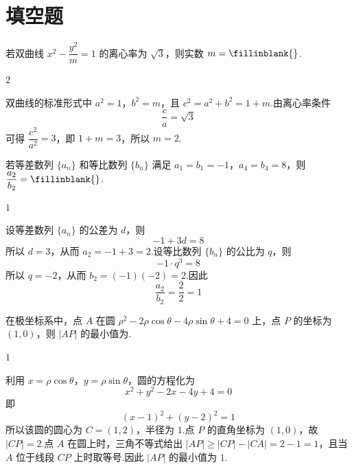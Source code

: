 \section{填空题}

\begin{problem}
若双曲线 \(x^2-\dfrac{y^2}{m}=1\) 的离心率为 \(\sqrt3\)，则实数 \(m=\fillinblank{}\).
\end{problem}

\begin{answer}
\(2\)
\end{answer}

\begin{solution}
双曲线的标准形式中 \(a^2=1\)，\(b^2=m\)，且 \(c^2=a^2+b^2=1+m\).由离心率条件
\[
\frac{c}{a}=\sqrt3
\]
可得 \(\dfrac{c^2}{a^2}=3\)，即 \(1+m=3\)，所以 \(m=2\).
\end{solution}

\begin{problem}
若等差数列 \(\{a_n\}\) 和等比数列 \(\{b_n\}\) 满足 \(a_1=b_1=-1\)，\(a_4=b_4=8\)，则 \(\dfrac{a_2}{b_2}=\fillinblank{}\).
\end{problem}

\begin{answer}
\(1\)
\end{answer}

\begin{solution}
设等差数列 \(\{a_n\}\) 的公差为 \(d\)，则
\[
-1+3d=8
\]
所以 \(d=3\)，从而 \(a_2=-1+3=2\).设等比数列 \(\{b_n\}\) 的公比为 \(q\)，则
\[
-1\cdot q^3=8
\]
所以 \(q=-2\)，从而 \(b_2=(-1)(-2)=2\).因此
\[
\frac{a_2}{b_2}=\frac22=1
\]
\end{solution}

\begin{problem}
在极坐标系中，点 \(A\) 在圆 \(\rho^2-2\rho\cos\theta-4\rho\sin\theta+4=0\) 上，点 \(P\) 的坐标为 \((1,0)\)，则 \(|AP|\) 的最小值为\fillinblank{}.
\end{problem}

\begin{answer}
\(1\)
\end{answer}

\begin{solution}
利用 \(x=\rho\cos\theta\)，\(y=\rho\sin\theta\)，圆的方程化为
\[
x^2+y^2-2x-4y+4=0
\]
即
\[
(x-1)^2+(y-2)^2=1
\]
所以该圆的圆心为 \(C=(1,2)\)，半径为 \(1\).点 \(P\) 的直角坐标为 \((1,0)\)，故 \(|CP|=2\).点 \(A\) 在圆上时，三角不等式给出 \(|AP|\ge|CP|-|CA|=2-1=1\)，且当 \(A\) 位于线段 \(CP\) 上时取等号.因此 \(|AP|\) 的最小值为 \(1\).
\end{solution}

